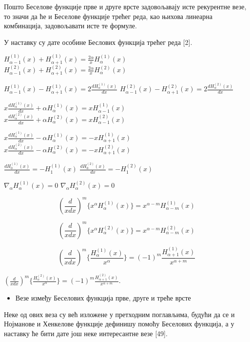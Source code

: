 Пошто Беселове функције прве и друге врсте задовољавају исте рекурентне
везе, то значи да ће и Беселове функције трећег реда, као њихова
линеарна комбинација, задовољавати исте те формуле.

У наставку су дате особине Беслових функција трећег реда {[}2{]}.

\(H_{\alpha - 1}^{(1)}(x) + H_{\alpha + 1}^{(1)}(x) = \frac{2\alpha}{x}H_{\alpha}^{(1)}(x)\)
\(H_{\alpha - 1}^{(2)}(x) + H_{\alpha + 1}^{(2)}(x) = \frac{2\alpha}{x}H_{\alpha}^{(2)}(x)\)

\(H_{\alpha - 1}^{(1)}(x) - H_{\alpha + 1}^{(1)}(x) = 2\frac{dH_{\alpha}^{(1)}(x)}{dx}\)
\(H_{\alpha - 1}^{(2)}(x) - H_{\alpha + 1}^{(2)}(x) = 2\frac{dH_{\alpha}^{(2)}(x)}{dx}\)

\(x\frac{dH_{\alpha}^{(1)}(x)}{dx} + \alpha H_{\alpha}^{(1)}(x) = xH_{\alpha - 1}^{(1)}(x)\)
\(x\frac{dH_{\alpha}^{(2)}(x)}{dx} + \alpha H_{\alpha}^{(2)}(x) = xH_{\alpha - 1}^{(2)}(x)\)

\(x\frac{dH_{\alpha}^{(1)}(x)}{dx} - \alpha H_{\alpha}^{(1)}(x) = - xH_{\alpha + 1}^{(1)}(x)\)
\(x\frac{dH_{\alpha}^{(2)}(x)}{dx} - \alpha H_{\alpha}^{(2)}(x) = - xH_{\alpha + 1}^{(2)}(x)\)

\(\frac{dH_{0}^{(1)}(x)}{dx} = - H_{1}^{(1)}(x)\)
\(\frac{dH_{0}^{(2)}(x)}{dx} = - H_{1}^{(2)}(x)\)

\(\nabla_{\alpha}H_{\alpha}^{(1)}(x) = 0\)
\(\nabla_{\alpha}H_{\alpha}^{(2)}(x) = 0\)

\[\left( \frac{d}{xdx} \right)^{m}\{ x^{\alpha}H_{\alpha}^{(1)}(x)\} = x^{\alpha - m}H_{\alpha - m}^{(1)}(x)\]

\[\left( \frac{d}{xdx} \right)^{m}\{ x^{\alpha}H_{\alpha}^{(2)}(x)\} = x^{\alpha - m}H_{\alpha - m}^{(2)}(x)\]

\[\left( \frac{d}{xdx} \right)^{m}\{\frac{H_{\alpha}^{(1)}(x)}{x^{\alpha}}\} = {( - 1)}^{m}\frac{H_{\alpha + 1}^{(1)}(x)}{x^{\alpha + m}}\]

\(\left( \frac{d}{xdx} \right)^{m}\{\frac{H_{\alpha}^{(2)}(x)}{x^{\alpha}}\} = {( - 1)}^{m}\frac{H_{\alpha + 1}^{(2)}(x)}{x^{\alpha + m}}\).

\begin{itemize}
\item
  Везе између Беселових функција прве, друге и треће врсте
\end{itemize}

Неке од ових веза су већ изложене у претходним поглављима, будући да се
и Нојманове и Хенкелове функције дефинишу помоћу Беселових функција, а у
наставку ће бити дате још неке интересантне везе {[}49{]}.

